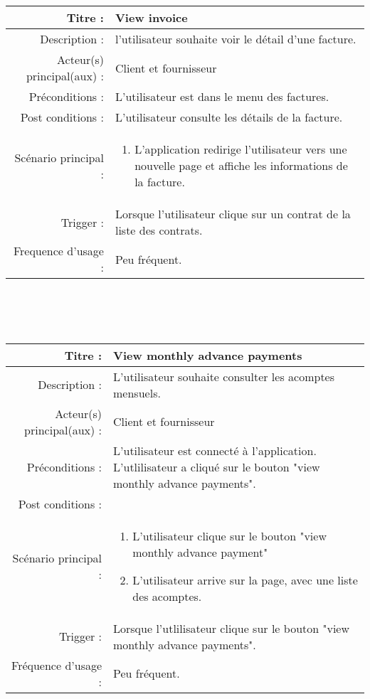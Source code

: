 \documentclass[../rapport.tex]{subfiles}
\begin{document}
\begin{tabular}{|r|p{9cm}|}
    \hline
    Titre : & View invoice \\
    \hline
    Description : & l'utilisateur souhaite voir le détail d'une facture. \\
    \hline
    Acteur(s) principal(aux) : & Client et fournisseur \\
    \hline
    Préconditions : & L'utilisateur est dans le menu des factures. \\
    \hline
    Post conditions : & L'utilisateur consulte les détails de la facture. \\
    \hline 
    Scénario principal : & \begin{enumerate}[left=0pt, topsep=0pt]
        \item L'application redirige l'utilisateur vers une nouvelle page et affiche les informations de la facture. 
    \end{enumerate} \nointerlineskip \\
    \hline 
    Trigger : & Lorsque l'utilisateur clique sur un contrat de la liste des contrats. \\
    \hline 
    Frequence d'usage : & Peu fréquent. \\
    \hline
\end{tabular}
\\ \\ \\
\begin{tabular}{|r|p{9cm}|}
    \hline
    Titre : & View monthly advance payments \\
    \hline
    Description : & L'utilisateur souhaite consulter les acomptes mensuels.\\
    \hline
    Acteur(s) principal(aux) : & Client et fournisseur\\
    \hline
    Préconditions : & L'utilisateur est connecté à l'application. L'utlilisateur a cliqué sur le bouton "view monthly advance payments".\\
    \hline 
    Post conditions : & \ \\
    \hline 
    Scénario principal : & \begin{enumerate}
        \item L'utilisateur clique sur le bouton "view monthly advance payment"
        \item L'utilisateur arrive sur la page, avec une liste des acomptes. 
    \end{enumerate} \nointerlineskip \\
    \hline
    Trigger : & Lorsque l'utlilisateur clique sur le bouton "view monthly advance payments". \\
    \hline 
    Fréquence d'usage : & Peu fréquent.  \\
    \hline
\end{tabular}
\end{document}
